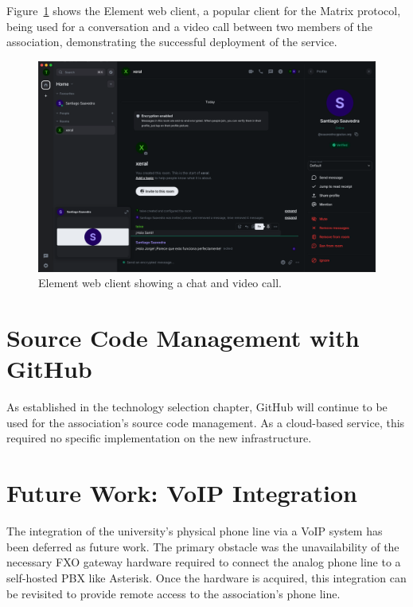 Figure~\ref{fig:element-example} shows the Element web client, a popular client for the Matrix protocol, being used for a conversation and a video call between two members of the association, demonstrating the successful deployment of the service.

\begin{figure}[H]
	\centering
	\includegraphics[width=\textwidth]{imaxes/element-example.png}
	\caption{Element web client showing a chat and video call.}
	\label{fig:element-example}
\end{figure}

\section{Source Code Management with GitHub}

As established in the technology selection chapter, GitHub will continue to be used for the association's source code management. As a cloud-based service, this required no specific implementation on the new infrastructure.

\section{Future Work: VoIP Integration}

The integration of the university's physical phone line via a VoIP system has been deferred as future work. The primary obstacle was the unavailability of the necessary FXO gateway hardware required to connect the analog phone line to a self-hosted PBX like Asterisk. Once the hardware is acquired, this integration can be revisited to provide remote access to the association's phone line.
